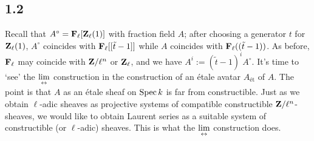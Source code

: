 \documentclass[deligne.tex]{subfiles}
\begin{document}
\subsection*{1.2}
Recall that $A^\circ=\mathbf{F}_\ell[\mathbf{Z}_\ell(1)]$ with fraction field 
$A$; after choosing a generator $t$ for $\mathbf{Z}_\ell(1)$, $A^\circ$ coincides 
with $\mathbf{F}_\ell[[\tilde t-1]]$ while $A$ coincides with
$\mathbf{F}_\ell((\tilde t-1))$. As before, $\mathbf{F}_\ell$ may coincide with
$\mathbf{Z}/\ell^n$ or $\mathbf{Z}_\ell$, and we have $A^i:=(\tilde t-1)^iA^\circ$.
It's time to `see' the $\displaystyle\lim_{\leftrightarrow}$ construction in the
construction of an étale avatar $A_{\text{\'et}}$ of $A$.
The point is that $A$ as an étale sheaf on $\operatorname{Spec} k$ is far from 
constructible. Just as we obtain $\ell$-adic sheaves as projective systems
of compatible constructible $\mathbf{Z}/\ell^n$-sheaves, we would like to obtain
Laurent series as a suitable system of constructible (or $\ell$-adic) 
sheaves. This is what the $\displaystyle\lim_{\leftrightarrow}$ construction does.
\end{document}
